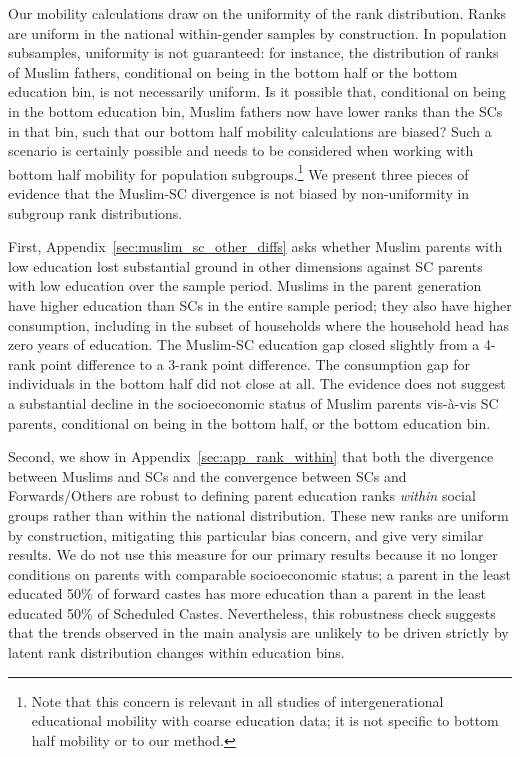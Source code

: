 \documentclass[12pt,letterpaper]{article}
\numberwithin{equation}{section}
\begin{document}
Our mobility calculations draw on the uniformity of the rank distribution. Ranks are uniform in the national within-gender samples by construction. In population subsamples, uniformity is not guaranteed: for instance, the distribution of ranks of Muslim fathers, conditional on being in the bottom half or the bottom education bin, is not necessarily uniform. Is it possible that, conditional on being in the bottom education bin, Muslim fathers now have lower ranks than the SCs in that bin, such that our bottom half mobility calculations are biased? Such a scenario is certainly possible and needs to be considered when working with bottom half mobility for population subgroups.\footnote{Note that this concern is relevant in all studies of intergenerational educational mobility with coarse education data; it is not specific to bottom half mobility or to our method.} We present three pieces of evidence that the Muslim-SC divergence is not biased by non-uniformity in subgroup rank distributions.

First, Appendix~\ref{sec:muslim_sc_other_diffs} asks whether Muslim parents with low education lost substantial ground in other dimensions against SC parents with low education over the sample period. Muslims in the parent generation have higher education than SCs in the entire sample period; they also have higher consumption, including in the subset of households where the household head has zero years of education. The Muslim-SC education gap closed slightly from a 4-rank point difference to a 3-rank point difference. The consumption gap for individuals in the bottom half did not close at all. The evidence does not suggest a substantial decline in the socioeconomic status of Muslim parents vis-\`{a}-vis SC parents, conditional on being in the bottom half, or the bottom education bin.

Second, we show in Appendix~\ref{sec:app_rank_within} that both the divergence between Muslims and SCs and the convergence between SCs and Forwards/Others are robust to defining parent education ranks \textit{within} social groups rather than within the national distribution. These new ranks are uniform by construction, mitigating this particular bias concern, and give very similar results. We do not use this measure for our primary results because it no longer conditions on parents with comparable socioeconomic status; a parent in the least educated 50\% of forward castes has more education than a parent in the least educated 50\% of Scheduled Castes. Nevertheless, this robustness check suggests that the trends observed in the main analysis are unlikely to be driven strictly by latent rank distribution changes within education bins. 
\end{document}
